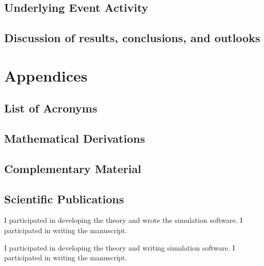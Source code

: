 \documentclass[11pt]{book}
\begin{document}
\chapter{Underlying Event Activity}
%
\chapter{Discussion of results, conclusions, and outlooks}


\appendix
\part{Appendices}
\chapter{List of Acronyms}

\chapter{Mathematical Derivations}

\chapter{Complementary Material}

\chapter{Scientific Publications}



I participated in developing the theory and wrote the simulation software. I participated in writing the manuscript.


I participated in developing the theory and writing simulation software. I participated in writing the manuscript.






\renewcommand{\bibname}{References}
%


\end{document}
